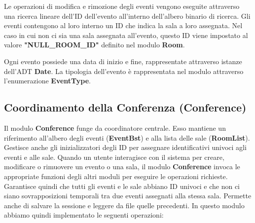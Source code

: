 \documentclass[11pt]{scrartcl} %
\begin{document}
Le operazioni di modifica e rimozione degli eventi vengono eseguite attraverso una ricerca lineare dell'ID dell'evento all'interno dell'albero binario di ricerca. Gli eventi contengono al loro interno un ID che indica la sala a loro assegnata. Nel caso in cui non ci sia una sala assegnata all'evento, questo ID viene impostato al valore \textbf{"NULL\_ROOM\_ID"} definito nel modulo \textbf{Room}.

Ogni evento possiede una data di inizio e fine, rappresentate attraverso istanze dell'ADT \textbf{Date}. La tipologia dell'evento è rappresentata nel modulo attraverso l'enumerazione \textbf{EventType}.


\subsection{Coordinamento della Conferenza (Conference)}
Il modulo \textbf{Conference} funge da coordinatore centrale. Esso mantiene un riferimento all'albero degli eventi (\textbf{EventBst}) e alla lista delle sale (\textbf{RoomList}). Gestisce anche gli inizializzatori degli ID per assegnare identificativi univoci agli eventi e alle sale. Quando un utente interagisce con il sistema per creare, modificare o rimuovere un evento o una sala, il modulo \textbf{Conference} invoca le appropriate funzioni degli altri moduli per eseguire le operazioni richieste. Garantisce quindi che tutti gli eventi e le sale abbiano ID univoci e che non ci siano sovrapposizioni temporali tra due eventi assegnati alla stessa sala. Permette anche di salvare la sessione e leggere da file quelle precedenti. 
In questo modulo abbiamo quindi implementato le seguenti operazioni:
\end{document}
